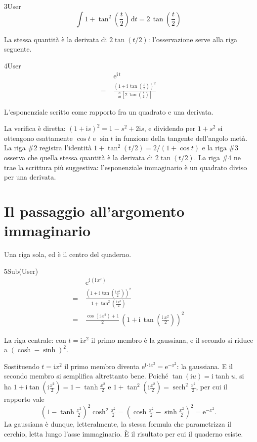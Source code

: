 \begin{espr}{3}{User}{}
\[
\int 1 + \tan^{2}\!\left(\frac{t}{2}\right) \,\mathrm{d}t = 2\, \tan\!\left(\frac{t}{2}\right)
\]
\end{espr}
La stessa quantità è la derivata di $2\tan(t/2)$: l'osservazione serve alla riga seguente.

\begin{espr}{4}{User}{\verificata}
\begin{align*}
& \mathrm{e}^{\mathrm{i}\, t} \\
=\;& \frac{\left(1 + \mathrm{i}\, \tan\!\left(\frac{t}{2}\right)\right)^{2}}{\frac{\mathrm{d}}{\mathrm{d}t}\!\left[2\, \tan\!\left(\frac{t}{2}\right)\right]}
\end{align*}
\end{espr}
L'esponenziale scritto come rapporto fra un quadrato e una derivata.


La verifica è diretta: $(1+\mathrm{i}s)^2=1-s^2+2\mathrm{i}s$, e dividendo per $1+s^2$ si ottengono esattamente $\cos t$ e $\sin t$ in funzione della tangente dell'angolo metà. La riga $\#2$ registra l'identità $1+\tan^2(t/2)=2/(1+\cos t)$ e la riga $\#3$ osserva che quella stessa quantità è la derivata di $2\tan(t/2)$. La riga $\#4$ ne trae la scrittura più suggestiva: l'esponenziale immaginario è un quadrato diviso per una derivata.

\section{Il passaggio all'argomento immaginario}

Una riga sola, ed è il centro del quaderno.

\begin{espr}{5}{Sub(User)}{\verificata}
\begin{align*}
& \mathrm{e}^{\mathrm{i}\, \left(\mathrm{i}\, x^{2}\right)} \\
=\;& \frac{\left(1 + \mathrm{i}\, \tan\!\left(\frac{\mathrm{i}\, x^{2}}{2}\right)\right)^{2}}{1 + \tan^{2}\!\left(\frac{\mathrm{i}\, x^{2}}{2}\right)} \\
=\;& \frac{\cos\!\left(\mathrm{i}\, x^{2}\right) + 1}{2}\, \left(1 + \mathrm{i}\, \tan\!\left(\frac{\mathrm{i}\, x^{2}}{2}\right)\right)^{2}
\end{align*}
\end{espr}
La riga centrale: con $t=\mathrm{i}x^2$ il primo membro è la gaussiana, e il secondo si riduce a $\left(\cosh-\sinh\right)^2$.


Sostituendo $t=\mathrm{i}x^2$ il primo membro diventa $\mathrm{e}^{\mathrm{i}\cdot\mathrm{i}x^2}=\mathrm{e}^{-x^2}$: la gaussiana. E il secondo membro si semplifica altrettanto bene. Poiché $\tan(\mathrm{i}u)=\mathrm{i}\tanh u$, si ha $1+\mathrm{i}\tan\!\left(\mathrm{i}\tfrac{x^2}{2}\right)=1-\tanh\tfrac{x^2}{2}$ e $1+\tan^2\!\left(\mathrm{i}\tfrac{x^2}{2}\right)=\operatorname{sech}^2\tfrac{x^2}{2}$, per cui il rapporto vale
\[
  \left(1-\tanh\tfrac{x^2}{2}\right)^2\cosh^2\tfrac{x^2}{2}
  =\left(\cosh\tfrac{x^2}{2}-\sinh\tfrac{x^2}{2}\right)^2
  =\mathrm{e}^{-x^2}.
\]
La gaussiana è dunque, letteralmente, la stessa formula che parametrizza il cerchio, letta lungo l'asse immaginario. È il risultato per cui il quaderno esiste.

